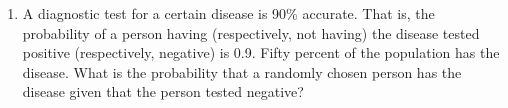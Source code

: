 \begin{enumerate}[label=\thesection.\arabic*.,ref=\thesection.\theenumi]
\item A diagnostic test for a certain disease is 90\% accurate. That is, the probability of a person having (respectively, not having) the disease tested positive (respectively, negative) is 0.9. Fifty percent of the population has the disease. What is the probability that a randomly chosen person has the disease given that the person tested negative?
\\
\solution



\end{enumerate}
